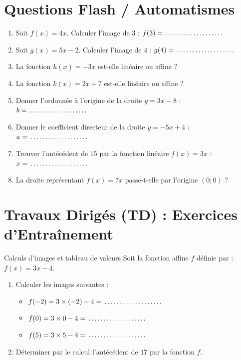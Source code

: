 \section{Questions Flash / Automatismes}

\begin{automatisme}
\begin{enumerate}[label=\textbf{Q\arabic*.}]
    \item Soit $f(x) = 4x$. Calculer l'image de $3$ : $f(3) = \pointille[3cm]$
    \item Soit $g(x) = 5x - 2$. Calculer l'image de $4$ : $g(4) = \pointille[3cm]$
    \item La fonction $h(x) = -3x$ est-elle linéaire ou affine ? \pointille[3cm]
    \item La fonction $k(x) = 2x + 7$ est-elle linéaire ou affine ? \pointille[3cm]
    \item Donner l'ordonnée à l'origine de la droite $y = 3x - 8$ : $b = \pointille[3cm]$
    \item Donner le coefficient directeur de la droite $y = -5x + 4$ : $a = \pointille[3cm]$
    \item Trouver l'antécédent de $15$ par la fonction linéaire $f(x) = 3x$ : $x = \pointille[3cm]$
    \item La droite représentant $f(x) = 7x$ passe-t-elle par l'origine $(0;0)$ ? \pointille[3cm]
\end{enumerate}
\end{automatisme}

\section{Travaux Dirigés (TD) : Exercices d'Entraînement}

\begin{exercice}[2 pts]{\capRealiser}{Calculs d'images et tableau de valeurs}
Soit la fonction affine $f$ définie par : $f(x) = 3x - 4$.
\begin{enumerate}[leftmargin=1.5em]
    \item Calculer les images suivantes :
    \begin{itemize}
        \item $f(-2) = 3 \times (-2) - 4 = \pointille[3cm]$
        \item $f(0) = 3 \times 0 - 4 = \pointille[3cm]$
        \item $f(5) = 3 \times 5 - 4 = \pointille[3cm]$
    \end{itemize}
    \item Déterminer par le calcul l'antécédent de $17$ par la fonction $f$.
\end{enumerate}
\lignesreponse[2]
\end{exercice}

